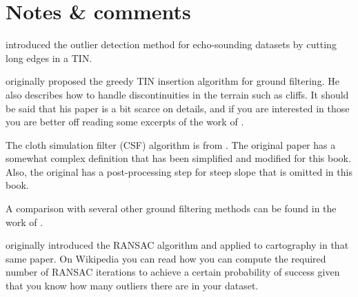 %
%
%
%
%


%
\section{Notes \& comments}

\citet{Arge10} introduced the outlier detection method for echo-sounding datasets by cutting long edges in a TIN\@.

\citet{axelsson2000generation} originally proposed the greedy TIN insertion algorithm for ground filtering.
He also describes how to handle discontinuities in the terrain such as cliffs.
It should be said that his paper is a bit scarce on details, and if you are interested in those you are better off reading some excerpts of the work of \citet{Lin14}. 

The cloth simulation filter (CSF) algorithm is from \citet{Zhang16}.
The original paper has a somewhat complex definition that has been simplified and modified for this book.
Also, the original has a post-processing step for steep slope that is omitted in this book.

A comparison with several other ground filtering methods can be found in the work of \citet{Meng10}.

\citet{Fischler81} originally introduced the RANSAC algorithm and applied to cartography in that same paper. On Wikipedia you can read how you can compute the required number of RANSAC iterations to achieve a certain probability of success given that you know how many outliers there are in your dataset.

